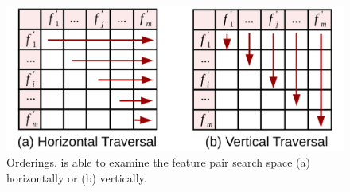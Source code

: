 
\begin{figure}[h]
 \centering
 \vspace{-5mm}
 \includegraphics[width=0.8\linewidth]{fig/traversal.pdf}
 \vspace{-5mm}
\caption{\traversal Orderings. \genviz is able to examine the feature pair search space (a) horizontally or (b) vertically.}
\vspace{-5mm}
\label{fig:traversal}
\end{figure}




